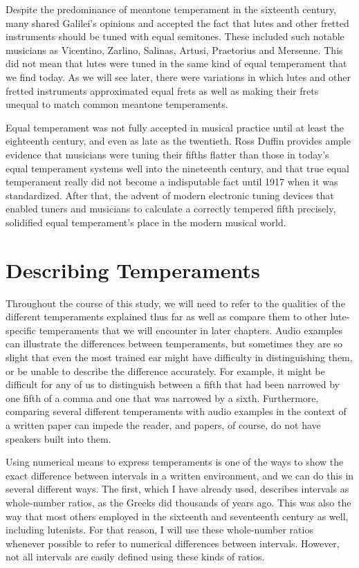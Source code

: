 Despite the predominance of meantone temperament in the sixteenth century, many shared
Galilei's opinions and accepted the fact that lutes and other fretted instruments should
be tuned with equal semitones.  These included such notable musicians as Vicentino,
Zarlino, Salinas, Artusi, Praetorius and Mersenne. \autocite[19]{ML:1} This did not
mean that lutes were tuned in the same kind of equal temperament that we find today. As
we will see later, there were variations in which lutes and other fretted
instruments approximated equal frets as well as making their frets unequal to match
common meantone temperaments.

Equal temperament was not fully accepted in musical practice until at least the
eighteenth century, and even as late as the twentieth.  Ross Duffin provides ample
evidence that musicians were tuning their fifths flatter than those in today's equal
temperament systems well into the nineteenth century, and that true equal temperament
really did not become a indisputable fact until 1917 when it was standardized.
\autocite[138]{RD:1}  After that, the advent of modern electronic tuning devices that
enabled tuners and musicians to calculate a correctly tempered fifth precisely,
solidified equal temperament's place in the modern musical world.

\section{Describing Temperaments}

Throughout the course of this study, we will need to refer to the qualities of the different
temperaments explained thus far as well as compare them to other lute-specific temperaments that we
will encounter in later chapters.  Audio examples can illustrate the differences between
temperaments, but sometimes they are so slight that even the most trained ear might have difficulty
in distinguishing them, or be unable to describe the difference accurately. For example, it might be
difficult for any of us to distinguish between a fifth that had been narrowed by one fifth of a
comma and one that was narrowed by a sixth.  Furthermore, comparing several different
temperaments with audio examples in the context of a written paper can impede the reader, and
papers, of course, do not have speakers built into them.

Using numerical means to express temperaments is one of the ways to show the exact
difference between intervals in a written environment, and we can do this in several different ways.
The first, which I have already used, describes intervals as whole-number ratios, as the Greeks did
thousands of years ago.  This was also the way that most others employed in the sixteenth and
seventeenth century as well, including lutenists.  For that reason, I will use these whole-number
ratios whenever possible to refer to numerical differences between intervals. However, not all
intervals are easily defined using these kinds of ratios.

